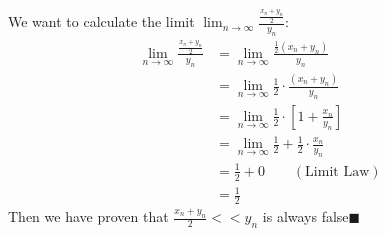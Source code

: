 \documentclass[12pt]{exam}
\newcommand {\DS} [1] {${\displaystyle #1}$}
\begin{document}
\begin{enumerate}
\begin{enumerate}
		We want to calculate the limit $\lim_{n\to\infty}\frac{\frac{x_n+y_n}{2}}{y_n}$:
		\begin{align*}
		    \lim_{n\to\infty}\frac{\frac{x_n+y_n}{2}}{y_n}&=\lim_{n\to\infty}\frac{\frac{1}{2}(x_n+y_n)}{y_n}\\
		    &=\lim_{n\to\infty}\frac{1}{2}\cdot\frac{(x_n+y_n)}{y_n}\\
		    &=\lim_{n\to\infty}\frac{1}{2}\cdot[1+\frac{x_n}{y_n}]\\
		    &=\lim_{n\to\infty}\frac{1}{2}+\frac{1}{2}\cdot\frac{x_n}{y_n}\\
		    &=\frac{1}{2}+0\qquad(\mbox{Limit Law})\\
		    &=\frac{1}{2}
		\end{align*}
		Then we have proven that \DS{\frac{x_n+y_n}{2} << y_n} is always false\qquad$\blacksquare$
	\end{enumerate}

\end{enumerate}
\end{document}

